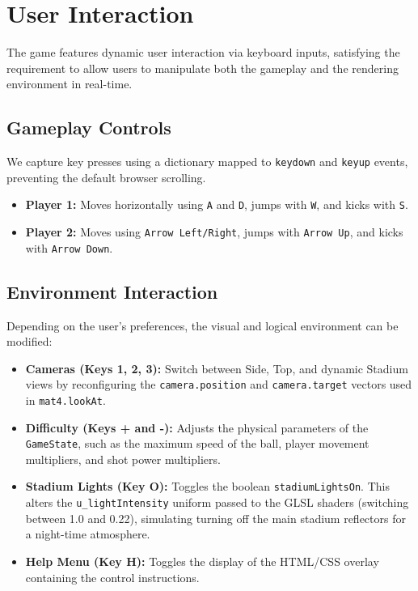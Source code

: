 \documentclass[10pt]{book}
\begin{document}
\chapter{User Interaction}

The game features dynamic user interaction via keyboard inputs, satisfying the requirement to allow users to manipulate both the gameplay and the rendering environment in real-time.

\section{Gameplay Controls}
We capture key presses using a dictionary mapped to \texttt{keydown} and \texttt{keyup} events, preventing the default browser scrolling.
\begin{itemize}
    \item \textbf{Player 1:} Moves horizontally using \texttt{A} and \texttt{D}, jumps with \texttt{W}, and kicks with \texttt{S}.
    \item \textbf{Player 2:} Moves using \texttt{Arrow Left/Right}, jumps with \texttt{Arrow Up}, and kicks with \texttt{Arrow Down}.
\end{itemize}

\section{Environment Interaction}
Depending on the user's preferences, the visual and logical environment can be modified:
\begin{itemize}
    \item \textbf{Cameras (Keys 1, 2, 3):} Switch between Side, Top, and dynamic Stadium views by reconfiguring the \texttt{camera.position} and \texttt{camera.target} vectors used in \texttt{mat4.lookAt}.
    \item \textbf{Difficulty (Keys + and -):} Adjusts the physical parameters of the \texttt{GameState}, such as the maximum speed of the ball, player movement multipliers, and shot power multipliers.
    \item \textbf{Stadium Lights (Key O):} Toggles the boolean \texttt{stadiumLightsOn}. This alters the \texttt{u\_lightIntensity} uniform passed to the GLSL shaders (switching between 1.0 and 0.22), simulating turning off the main stadium reflectors for a night-time atmosphere.
    \item \textbf{Help Menu (Key H):} Toggles the display of the HTML/CSS overlay containing the control instructions.
\end{itemize}
\end{document}
